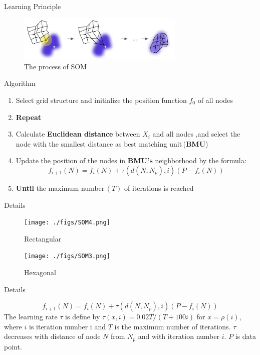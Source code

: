 \begin{frame}{Learning Principle}


\begin{figure}[htbp]
\includegraphics[width=8cm]{./figs/SOM3.jpg}

\caption{The process of SOM}
\end{figure}
\end{frame}





\begin{frame}{Algorithm}
\begin{enumerate}
\item	Select grid structure and initialize the position function $f_0$ of all nodes
\item \textbf{Repeat}
\item	 \quad Calculate \textbf{Euclidean distance} between $X_i$ and all nodes ,and select the node with the smallest distance as best matching unit\,(\textbf{BMU})
\item  \quad Update the position of the nodes in \textbf{BMU’s} neighborhood by the formula:
\begin{equation*}
f_{i+1}(N)=f_i(N)+\tau(d(N,N_p),i)(P-f_i(N))
\end{equation*}
\item \textbf{Until} the  maximum number\,$(T)$ of iterations  is reached
\end{enumerate}


\end{frame}


\begin{frame}{Details}
\begin{figure}
\begin{minipage}[t]{0.5\linewidth}
\centering
\texttt{[image: ./figs/SOM4.png]}
\caption{ Rectangular}
\end{minipage}%
\begin{minipage}[t]{0.5\linewidth}
\centering
\texttt{[image: ./figs/SOM3.png]}
\caption{ Hexagonal}
\end{minipage}
\end{figure}
\end{frame}



\begin{frame}{Details}

\begin{equation*}
f_{i+1}(N)=f_i(N)+\tau(d(N,N_p),i)(P-f_i(N))
\end{equation*}
The learning rate $\tau$ is define by $\tau(x,i)=0.02T/(T+100i)$ for $x=\rho(i)$, where $i$ is iteration number i and $T$ is the maximum number of iterations. $\tau$ decreases with distance of node $N$ from $N_p$
and with iteration number $i$. $P$ is data point.
\end{frame}


